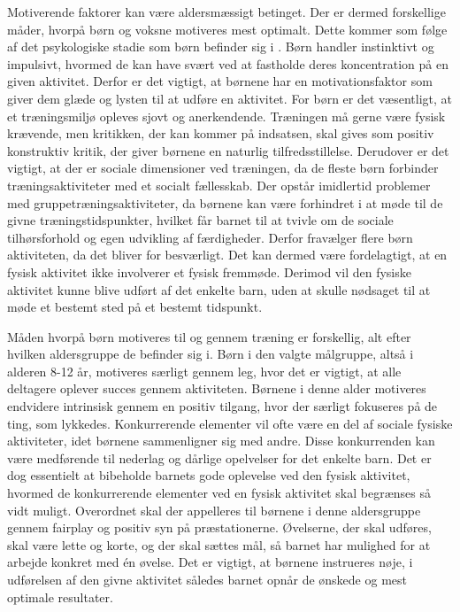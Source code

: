 Motiverende faktorer kan være aldersmæssigt betinget. Der er dermed forskellige måder, hvorpå børn og voksne motiveres mest optimalt. Dette kommer som følge af det psykologiske stadie som børn befinder sig i \citep{V.Brown2007}. Børn handler instinktivt og impulsivt, hvormed de kan have svært ved at fastholde deres koncentration på en given aktivitet. Derfor er det vigtigt, at børnene har en motivationsfaktor som giver dem glæde og lysten til at udføre en aktivitet. \citep{V.Brown2007} \newline
For børn er det væsentligt, at et træningsmiljø opleves sjovt og anerkendende. Træningen må gerne være fysisk krævende, men kritikken, der kan kommer på indsatsen, skal gives som positiv konstruktiv kritik, der giver børnene en naturlig tilfredsstillelse. Derudover er det vigtigt, at der er sociale dimensioner ved træningen, da de fleste børn forbinder træningsaktiviteter med et socialt fællesskab. Der opstår imidlertid problemer med gruppetræningsaktiviteter, da børnene kan være forhindret i at møde til de givne træningstidspunkter, hvilket får barnet til at tvivle om de sociale tilhørsforhold og egen udvikling af færdigheder. Derfor fravælger flere børn aktiviteten, da det bliver for besværligt. Det kan dermed være fordelagtigt, at en fysisk aktivitet ikke involverer et fysisk fremmøde. Derimod vil den fysiske aktivitet kunne blive udført af det enkelte barn, uden at skulle nødsaget til at møde et bestemt sted på et bestemt tidspunkt.  \citep{Wied2011,Romani2013}\newline

Måden hvorpå børn motiveres til og gennem træning er forskellig, alt efter hvilken aldersgruppe de befinder sig i. Børn i den valgte målgruppe, altså i alderen 8-12 år, motiveres særligt gennem leg, hvor det er vigtigt, at alle deltagere oplever succes gennem aktiviteten. Børnene i denne alder motiveres endvidere intrinsisk gennem en positiv tilgang, hvor der særligt fokuseres på de ting, som lykkedes. Konkurrerende elementer vil ofte være en del af sociale fysiske aktiviteter, idet børnene sammenligner sig med andre. Disse konkurrenden kan være medførende til nederlag og dårlige opelvelser for det enkelte barn. Det er dog essentielt at bibeholde barnets gode oplevelse ved den fysisk aktivitet, hvormed de konkurrerende elementer ved en fysisk aktivitet skal begrænses så vidt muligt. 
Overordnet skal der appelleres til børnene i denne aldersgruppe gennem fairplay og positiv syn på præstationerne. Øvelserne, der skal udføres, skal være lette og korte, og der skal sættes mål, så barnet har mulighed for at arbejde konkret med én øvelse. Det er vigtigt, at børnene instrueres nøje, i udførelsen af den givne aktivitet således barnet opnår de ønskede og mest optimale resultater. \citep{Wied2011} 

